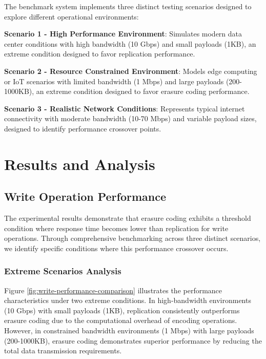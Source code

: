 The benchmark system implements three distinct testing scenarios designed to explore different operational environments:

\textbf{Scenario 1 - High Performance Environment}: Simulates modern data center conditions with high bandwidth (10 Gbps) and small payloads (1KB), an extreme condition designed to favor replication performance.

\textbf{Scenario 2 - Resource Constrained Environment}: Models edge computing or IoT scenarios with limited bandwidth (1 Mbps) and large payloads (200-1000KB), an extreme condition designed to favor erasure coding performance.

\textbf{Scenario 3 - Realistic Network Conditions}: Represents typical internet connectivity with moderate bandwidth (10-70 Mbps) and variable payload sizes, designed to identify performance crossover points.

\section{Results and Analysis}

\subsection{Write Operation Performance}

The experimental results demonstrate that erasure coding exhibits a threshold condition where response time becomes lower than replication for write operations. Through comprehensive benchmarking across three distinct scenarios, we identify specific conditions where this performance crossover occurs.

\subsubsection{Extreme Scenarios Analysis}

Figure \ref{fig:write-performance-comparison} illustrates the performance characteristics under two extreme conditions. In high-bandwidth environments (10 Gbps) with small payloads (1KB), replication consistently outperforms erasure coding due to the computational overhead of encoding operations. However, in constrained bandwidth environments (1 Mbps) with large payloads (200-1000KB), erasure coding demonstrates superior performance by reducing the total data transmission requirements.

